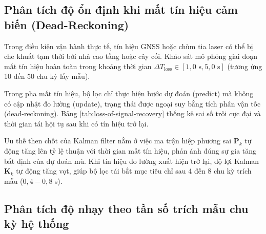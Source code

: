 \subsection{Phân tích độ ổn định khi mất tín hiệu cảm biến (Dead-Reckoning)}

\hspace{0.5cm} Trong điều kiện vận hành thực tế, tín hiệu GNSS hoặc chùm tia laser có thể bị che khuất tạm thời bởi nhà cao tầng hoặc cây cối. Khảo sát mô phỏng giai đoạn mất tín hiệu hoàn toàn trong khoảng thời gian $\Delta T_{\text{loss}} \in [1{,}0\text{ s}, 5{,}0\text{ s}]$ (tương ứng 10 đến 50 chu kỳ lấy mẫu).

Trong pha mất tín hiệu, bộ lọc chỉ thực hiện bước dự đoán (predict) mà không có cập nhật đo lường (update), trạng thái được ngoại suy bằng tích phân vận tốc (dead-reckoning). Bảng \ref{tab:loss-of-signal-recovery} thống kê sai số trôi cực đại và thời gian tái hội tụ sau khi có tín hiệu trở lại.

\begin{table}[H]
\centering
\caption{Đánh giá sai số ngoại suy và thời gian tái bắt mục tiêu sau khi mất tín hiệu}
\label{tab:loss-of-signal-recovery}
\end{table}

Ưu thế then chốt của Kalman filter nằm ở việc ma trận hiệp phương sai $\mathbf{P}_k$ tự động tăng lên tỷ lệ thuận với thời gian mất tín hiệu, phản ánh đúng sự gia tăng bất định của dự đoán mù. Khi tín hiệu đo lường xuất hiện trở lại, độ lợi Kalman $\mathbf{K}_k$ tự động tăng vọt, giúp bộ lọc tái bắt mục tiêu chỉ sau 4 đến 8 chu kỳ trích mẫu ($0{,}4 - 0{,}8$ s).

\subsection{Phân tích độ nhạy theo tần số trích mẫu chu kỳ hệ thống}

